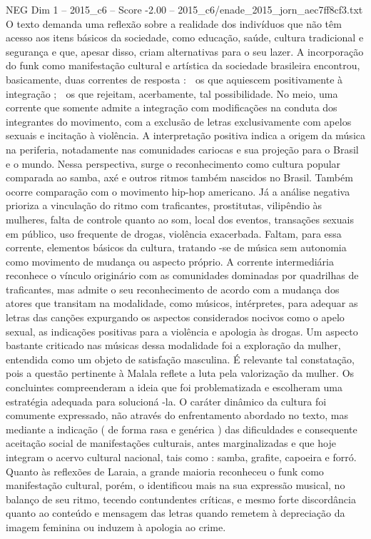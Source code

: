\begin{textsample}{NEG Dim 1 – 2015\_c6 – Score -2.00 – 2015\_c6/enade\_2015\_jorn\_aec7ff8cf3.txt}
O texto demanda uma reflexão sobre a realidade dos indivíduos que não têm acesso aos itens básicos da sociedade, como educação, saúde, cultura tradicional e segurança e que, apesar disso, criam alternativas para o seu lazer.
A incorporação do funk como manifestação cultural e artística da sociedade brasileira encontrou, basicamente, duas correntes de resposta :  os que aquiescem positivamente à integração ;  os que rejeitam, acerbamente, tal possibilidade.
No meio, uma corrente que somente admite a integração com modificações na conduta dos integrantes do movimento, com a exclusão de letras exclusivamente com apelos sexuais e incitação à violência.
A interpretação positiva indica a origem da música na periferia, notadamente nas comunidades cariocas e sua projeção para o Brasil e o mundo.
Nessa perspectiva, surge o reconhecimento como cultura popular comparada ao samba, axé e outros ritmos também nascidos no Brasil.
Também ocorre comparação com o movimento hip-hop americano.
Já a análise negativa prioriza a vinculação do ritmo com traficantes, prostitutas, vilipêndio às mulheres, falta de controle quanto ao som, local dos eventos, transações sexuais em público, uso frequente de drogas, violência exacerbada.
Faltam, para essa corrente, elementos básicos da cultura, tratando -se de música sem autonomia como movimento de mudança ou aspecto próprio.
A corrente intermediária reconhece o vínculo originário com as comunidades dominadas por quadrilhas de traficantes, mas admite o seu reconhecimento de acordo com a mudança dos atores que transitam na modalidade, como músicos, intérpretes, para adequar as letras das canções expurgando os aspectos considerados nocivos como o apelo sexual, as indicações positivas para a violência e apologia às drogas.
Um aspecto bastante criticado nas músicas dessa modalidade foi a exploração da mulher, entendida como um objeto de satisfação masculina.
É relevante tal constatação, pois a questão pertinente à Malala reflete a luta pela valorização da mulher.
Os concluintes compreenderam a ideia que foi problematizada e escolheram uma estratégia adequada para solucioná -la.
O caráter dinâmico da cultura foi comumente expressado, não através do enfrentamento abordado no texto, mas mediante a indicação ( de forma rasa e genérica ) das dificuldades e consequente aceitação social de manifestações culturais, antes marginalizadas e que hoje integram o acervo cultural nacional, tais como : samba, grafite, capoeira e forró.
Quanto às reflexões de Laraia, a grande maioria reconheceu o funk como manifestação cultural, porém, o identificou mais na sua expressão musical, no balanço de seu ritmo, tecendo contundentes críticas, e mesmo forte discordância quanto ao conteúdo e mensagem das letras quando remetem à depreciação da imagem feminina ou induzem à apologia ao crime.

\end{textsample}
